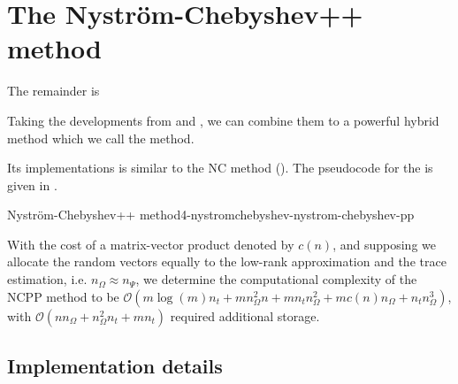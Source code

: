 
\section{The Nystr\"om-Chebyshev++ method}
\label{sec:4-nystromchebyshev-nystromchebyshev-pp}

The remainder is 

Taking the developments from  and ,
we can combine them to a powerful hybrid method which we call the 
method.


Its implementations is similar to the \gls{NC} method ().
The pseudocode for the  is given in .

\begin{algo}{Nystr\"om-Chebyshev++ method}{4-nystromchebyshev-nystrom-chebyshev-pp}
    
\end{algo}

With the cost of a matrix-vector product denoted by
$c(n)$, and supposing we allocate the random vectors equally
to the low-rank approximation and the trace estimation, i.e. $n_{\Omega} \approx n_{\Psi}$,
we determine the computational complexity of the \gls{NCPP}
method to be $\mathcal{O}(m \log(m) n_t + m n_{\Omega}^2 n + m n_t n_{\Omega}^2 +  m c(n) n_{\Omega} + n_t n_{\Omega}^3)$, with
$\mathcal{O}(n n_{\Omega} + n_{\Omega}^2 n_t + m n_t)$ required additional storage.\\


\subsection{Implementation details}
\label{subsec:4-nystromchebyshev-implementation-details}


